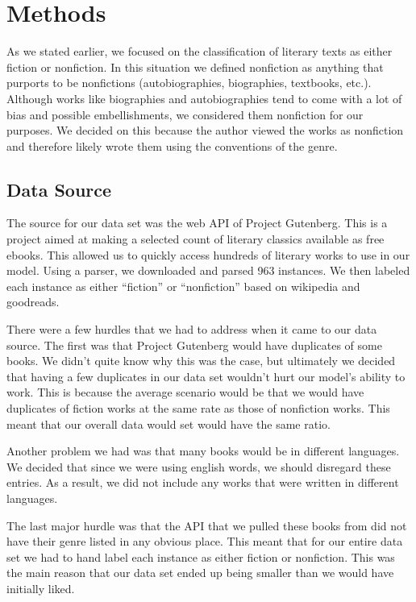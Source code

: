 \documentclass{article}
\begin{document}
\section{Methods}

As we stated earlier, we focused on the classification of literary texts as either fiction or nonfiction. In this situation we defined nonfiction as anything that purports to be nonfictions (autobiographies, biographies, textbooks, etc.). Although works like biographies and autobiographies tend to come with a lot of bias and possible embellishments, we considered them nonfiction for our purposes. We decided on this because the author viewed the works as nonfiction and therefore likely wrote them using the conventions of the genre.

\subsection{Data Source}

The source for our data set was the web API of Project Gutenberg. This is a project aimed at making a selected count of literary classics available as free ebooks. This allowed us to quickly access hundreds of literary works to use in our model. Using a parser, we downloaded and parsed 963 instances. We then labeled each instance as either “fiction” or “nonfiction” based on wikipedia and goodreads.\par
There were a few hurdles that we had to address when it came to our data source. The first was that Project Gutenberg would have duplicates of some books. We didn’t quite know why this was the case, but ultimately we decided that having a few duplicates in our data set wouldn’t hurt our model’s ability to work. This is because the average scenario would be that we would have duplicates of fiction works at the same rate as those of nonfiction works. This meant that our overall data would set would have the same ratio.\par
Another problem we had was that many books would be in different languages. We decided that since we were using english words, we should disregard these entries. As a result, we did not include any works that were written in different languages.\par
The last major hurdle was that the API that we pulled these books from did not have their genre listed in any obvious place. This meant that for our entire data set we had to hand label each instance as either fiction or nonfiction. This was the main reason that our data set ended up being smaller than we would have initially liked.
\end{document}
